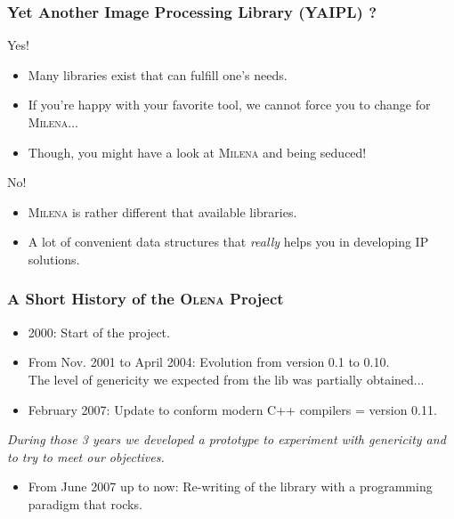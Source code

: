 \documentclass{beamer}
\newcommand{\oln}{\textsc{Olena}\xspace}
\newcommand{\mln}{\textsc{Milena}\xspace}
\begin{document}
\begin{frame}
  \frametitle{Yet Another Image Processing Library (YAIPL) ?}

  \begin{block}{Yes!}
    \begin{itemize}
    \item Many libraries exist that can fulfill one's needs.
    \item If you're happy with your favorite tool, we cannot force you
      to change for \mln...
    \item Though, you might have a look at \mln and being seduced!
    \end{itemize}
    
  \end{block}
 
  \bigskip

  \begin{block}{No!}
    \begin{itemize}
    \item \mln is rather different that available libraries.
    \item A lot of convenient data structures that \emph{really} helps
      you in developing IP solutions.
    \end{itemize}
  \end{block}

\end{frame}


\begin{frame}
  \frametitle{A Short History of the \oln Project}

  {\small
    
  \begin{itemize}
  \item 2000: Start of the project.
  \item From Nov. 2001 to April 2004: Evolution from version 0.1 to 0.10.\\
    The level of genericity we expected from the lib was partially obtained...
  \item February 2007: Update to conform modern C++ compilers = version 0.11.\\
  \end{itemize}

  \medskip

  \textit{During those 3 years we developed a prototype to experiment with
    genericity and to try to meet our objectives.}

  \medskip

  \begin{itemize}
  \item From June 2007 up to now: Re-writing of the library with a
    programming paradigm that rocks.
  \end{itemize}

}%

\end{frame}
\end{document}
